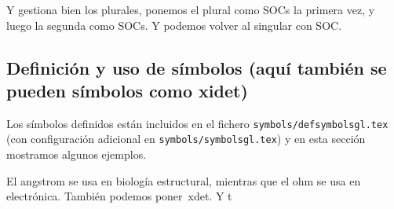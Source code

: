 Y gestiona bien los plurales, ponemos el plural como \acp{SOC} la
primera vez, y luego la segunda como \acp{SOC}. Y podemos volver al
singular con \ac{SOC}.


\subsection{Definición y uso de símbolos (aquí también
    se pueden símbolos como \ac{xidet})}
\label{sec:simbolos}

Los símbolos definidos están incluidos en el fichero
\texttt{symbols/defsymbolsgl.tex} (con configuración adicional en
\texttt{symbols/symbolsgl.tex}) y en esta sección mostramos algunos
ejemplos.

El \ac{angstrom} se usa en biología estructural, mientras que el
\ac{ohm} se usa en electrónica. También podemos poner~\ac{xdet}. Y
t
